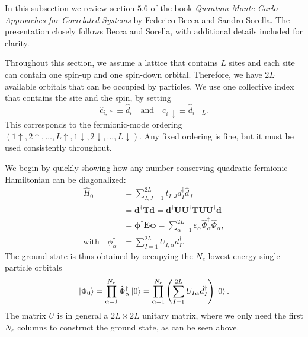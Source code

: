 \documentclass[../../../main.tex]{subfiles}
\begin{document}
In this subsection we review section $5.6$ of the book \emph{Quantum Monte Carlo Approaches for Correlated Systems} by Federico Becca and Sandro Sorella. The presentation closely follows Becca and Sorella, with additional details included for clarity.

Throughout this section, we assume a lattice that contains $L$ sites and each site can contain one spin-up and one spin-down orbital. Therefore, we have $2L$ available orbitals that can be occupied by particles. We use one collective index that contains the site and the spin, by setting
\begin{equation}
    \hat c_{i, \uparrow} \equiv \hat d_i \quad \text{and} \quad \hat c_{i, \downarrow} \equiv \hat d_{i+L} . \label{eq:collective-index-site-and-spin}
\end{equation}
This corresponds to the fermionic-mode ordering $(1\uparrow,2\uparrow,\ldots,L\uparrow,
1\downarrow,2\downarrow,\ldots,L\downarrow)$. Any fixed ordering is fine, but it must be used consistently throughout.

We begin by quickly showing how any number-conserving quadratic fermionic Hamiltonian can be diagonalized:
\begin{align}
    \hat H_0
    &= \sum_{I,J=1}^{2L}
    t_{I,J} d_I^\dagger \hat d_J \\
    &= \bm d^\dagger \bm T \bm d 
    = \bm d^\dagger \bm U \bm U^\dagger \bm T \bm U \bm U^\dagger \bm d \\
    &= \bm \phi^\dagger \bm E \bm \phi 
    =\sum_{\alpha=1}^{2L}
    \varepsilon_\alpha \hat \Phi_\alpha^\dagger \hat \Phi_\alpha ,  \\
    \text{with} \quad \phi^\dagger_\alpha &= \sum_{I=1}^{2L} U_{I,\alpha} d_I^\dagger .
    \label{eq:quadratic-hamiltonian-diagonal}
\end{align}
The ground state is thus obtained by occupying the $N_{e}$ lowest-energy
single-particle orbitals
\begin{equation}
    \left\lvert \Phi_0 \right\rangle
    =
    \prod_{\alpha=1}^{N_{e}}
    \hat \Phi_\alpha^\dagger \left\lvert 0 \right\rangle
    =
    \prod_{\alpha=1}^{N_{e}}
    \left(
        \sum_{I=1}^{2L}
        U_{I\alpha}\hat d_I^\dagger
    \right)
    \left\lvert 0 \right\rangle.
    \label{eq:slater-ground-state}
\end{equation}
The matrix $U$ is in general a $2L\times 2L$ unitary matrix, where we only need the first $N_e$ columns to construct the ground state, as can be seen above.
\end{document}
